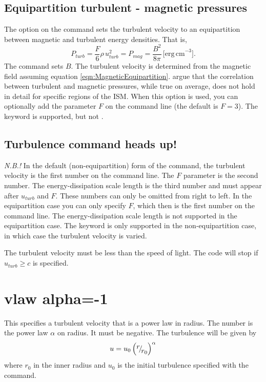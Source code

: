 \subsection{Equipartition turbulent - magnetic pressures }

The  option on the  command sets the turbulent
velocity to an equipartition between magnetic and
turbulent energy densities.
That is,
\begin{equation}
\label{eqn:MagneticEquipartition}
P_{turb}  = \frac{F}{6}\rho \,u_{turb}^2  = P_{mag}  = \frac{{B^2 }}{{8\pi
}}\, \mathrm{[erg\, cm}^{-3}].%
\end{equation}
The  command sets $B$.
The turbulent
velocity is determined from the magnetic field
assuming equation \ref{eqn:MagneticEquipartition}.
\citet{HeilesCrutcher2005} argue that the correlation between turbulent and
magnetic pressures, while true on average, does not hold in detail for
specific regions of the ISM. When this option is used, you can optionally add
the parameter $F$ on the command line (the default is $F=3$). The keyword  is
supported, but not .

\subsection{Turbulence command heads up!}

\emph{N.B.!}  In the default (non-equipartition) form of the command, the turbulent velocity is the first number
on the command line.
The $F$ parameter is the second number.
The energy-dissipation scale length is the third number and must appear
after $u_{turb}$ and $F$.
These numbers can only be omitted from right to left.
In the equipartition case you can only specify $F$,
which then is the first number on the command line.
The energy-dissipation scale length is not supported in the equipartition case.
The keyword  is only supported in the non-equipartition case,
in which case the turbulent velocity is varied.

The turbulent velocity must be less than the speed of light.
The code will stop if $u_{turb} \geq c$ is specified.

\section{vlaw alpha=-1}

This specifies a turbulent velocity that is a power law in radius.
The number is the power law $\alpha$ on radius.
It must be negative.
The turbulence will be given by
\begin{equation}
u = u_0 \left( {{\raise0.7ex\hbox{$r$} \!\mathord{\left/
 {\vphantom {r {r_0 }}}\right.\kern-\nulldelimiterspace}
\!\lower0.7ex\hbox{${r_0 }$}}} \right)^\alpha
\end{equation}
where $r_0$ in the inner radius and
$u_0$ is the initial turbulence specified with the
 command.
